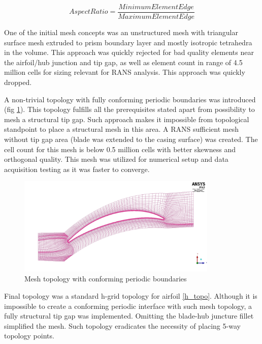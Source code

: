 \begin{equation} \label{eq:aspect}
Aspect Ratio = \frac{MinimumElementEdge}{MaximumElementEdge}
\end{equation}

One of the initial mesh concepts was an unstructured mesh with triangular surface mesh extruded to prism boundary layer and mostly isotropic tetrahedra in the volume. This approach was quickly rejected for bad quality elements near the airfoil/hub junction and tip gap, as well as element count in range of 4.5 million cells for sizing relevant for RANS analysis. This approach was quickly dropped.

A non-trivial topology with fully conforming periodic boundaries was introduced (fig \ref{cj_topo}). This topology fulfills all the prerequisites stated apart from possibility to mesh a structural tip gap. Such approach makes it impossible from topological standpoint to place a structural mesh in this area. A RANS sufficient mesh without tip gap area (blade was extended to the casing surface) was created. The cell count for this mesh is below 0.5 million cells with better skewness and orthogonal quality. This mesh was utilized for numerical setup and data acquisition testing as it was faster to converge.

\begin{figure}[h!]
\centering %
\includegraphics[width=0.85\textwidth]{Pictures/r67_cj.jpg}
\caption{Mesh topology with conforming periodic boundaries}
\label{cj_topo}
\end{figure}

Final topology was a standard h-grid topology for airfoil \ref{h_topo}. Although it is impossible to create a conforming periodic interface with such mesh topology, a fully structural tip gap was implemented. Omitting the blade-hub juncture fillet simplified the mesh.  Such topology eradicates the necessity of placing 5-way topology points.

